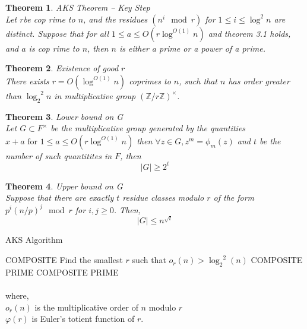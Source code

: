 \documentclass[paper=a4, fontsize=11pt]{scrartcl}	%
\numberwithin{equation}{section}		%
\numberwithin{figure}{section}		%
\numberwithin{table}{section}		%
\newtheorem{theorem}{Theorem}[section]
\begin{document}
\begin{theorem}
AKS Theorem -- Key Step\\
Let $r$be cop rime to $n$, and the residues $(n^i \mod r)$ for $1 \leq i \leq \log^2 n$ are distinct. Suppose that for all $1 \leq a \leq O(r {\log}^{O(1)}n)$ and theorem 3.1 holds, and $a$ is cop rime to $n$, then $n$ is either a prime or a power of a prime.
\end{theorem}

\begin{theorem}
Existence of good $r$\\
There exists $r =O( {\log}^{O(1)}n)$ coprimes to $n$, such that $n$ has order greater than ${\log_2}^2n$ in multiplicative group $(\mathbb{Z}/r\mathbb{Z})^\times$.
\end{theorem}

\begin{theorem}
Lower bound on G\\
Let $G \subset F^\times$ be the multiplicative group generated by the quantities $x+a \text{ for } 1\leq a \leq O(r {\log}^{O(1)}n)$ then $\forall z \in G, z^m = \phi_m(z)$ and $t$ be the number of such quantitites in $F$, then \\
\[|G| \geq 2^t\]
\end{theorem}

\begin{theorem}
Upper bound on G\\
Suppose that there are exactly $t$ residue classes modulo $r$ of the form $p^i(n/p)^j \mod r$ for $i,j \geq 0$. Then,
\[|G| \leq n^{\sqrt{t}}\]
\end{theorem}

\begin{algorithm}
\caption{AKS Algorithm}
\label{alg4}
\begin{algorithmic}
\RETURN COMPOSITE
\ENDIF
\STATE Find the smallest $r$ such that $o_r(n) > {\log_2}^2(n)$
\RETURN COMPOSITE
\ENDIF 
{}
\RETURN PRIME
\ENDIF
{}
\RETURN COMPOSITE
\ENDIF
\ENDFOR
\RETURN PRIME 
\end{algorithmic}
\end{algorithm}
\paragraph{}where,\\
$o_r(n)$ is the multiplicative order of $n$ modulo $r$ \\$\varphi(r)$ is Euler's totient function of $r$.
\end{document}
